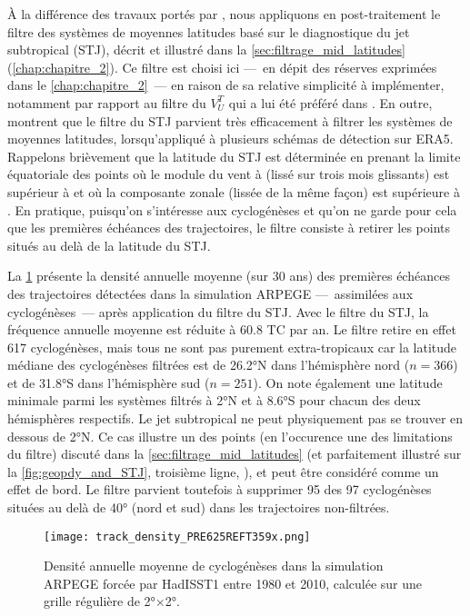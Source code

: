 \documentclass[../main.tex]{subfiles}
\begin{document}
À la différence des travaux portés par \textcite{cattiaux_projected_2020}, nous appliquons en post-traitement le filtre des systèmes de moyennes latitudes basé
sur le diagnostique du jet subtropical (STJ), décrit et illustré dans la \cref{sec:filtrage_mid_latitudes} (\cref{chap:chapitre_2}). Ce filtre est choisi ici
---~en dépit des réserves exprimées dans le \cref{chap:chapitre_2}~--- en raison de sa relative simplicité à implémenter, notamment par rapport au filtre du
$V_U^T$ qui a lui été préféré dans \textcite{dulac_assessing_2023}. En outre, \textcite{bourdin_intercomparison_2022} montrent que le filtre du STJ parvient
très efficacement à filtrer les systèmes de moyennes latitudes, lorsqu'appliqué à plusieurs schémas de détection sur ERA5. Rappelons brièvement que la latitude
du STJ est déterminée en prenant la limite équatoriale des points où le module du vent à  (lissé sur trois mois glissants) est supérieur à  et
où la composante zonale (lissée de la même façon) est supérieure à . En pratique, puisqu'on s'intéresse aux cyclogénèses et qu'on ne garde pour cela que
les premières échéances des trajectoires, le filtre consiste à retirer les points situés au delà de la latitude du STJ.

La \cref{fig:track_density_PRE625REFT359x} présente la densité annuelle moyenne (sur \num{30} ans) des premières échéances des trajectoires détectées dans la
simulation ARPEGE ---~assimilées aux cyclogénèses~--- après application du filtre du STJ. Avec le filtre du STJ, la fréquence annuelle moyenne est réduite à
\num{60.8} TC par an. Le filtre retire en effet \num{617} cyclogénèses, mais tous ne sont pas purement extra-tropicaux car la latitude médiane des cyclogénèses
filtrées est de \ang{26.2}N dans l'hémisphère nord ($n = \num{366}$) et de \ang{31.8}S dans l'hémisphère sud ($n=251$). On note également une latitude minimale
parmi les systèmes filtrés à \ang{2}N et à \ang{8.6}S pour chacun des deux hémisphères respectifs. Le jet subtropical ne peut physiquement pas se trouver en
dessous de \ang{2}N. Ce cas illustre un des points (en l'occurence une des limitations du filtre) discuté dans la \cref{sec:filtrage_mid_latitudes} (et
parfaitement illustré sur la \cref{fig:geopdy_and_STJ}, troisième ligne, ), et peut être considéré comme un effet de bord. Le
filtre parvient toutefois à supprimer \num{95} des \num{97} cyclogénèses situées au delà de \ang{40} (nord et sud) dans les trajectoires non-filtrées.

\begin{figure}[tb]
    \centering
    \texttt{[image: track\_density\_PRE625REFT359x.png]}
    \caption{Densité annuelle moyenne de cyclogénèses dans la simulation ARPEGE forcée par HadISST1 entre 1980 et 2010, calculée sur une grille régulière de
    \ang{2}$\times$\ang{2}.}
    \label{fig:track_density_PRE625REFT359x}
\end{figure}
\end{document}
